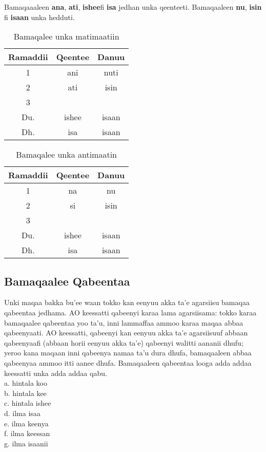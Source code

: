 \documentclass[11pt,b5paper]{book}
\begin{document}
Bamaqaaaleen \textbf{ana}, \textbf{ati}, \textbf{ishee}fi \textbf{isa} jedhan unka qeenteeti. Bamaqaaleen \textbf{nu}, \textbf{isin} fi \textbf{isaan} unka hedduti. 

\begin{table}[H]
	\centering
	\begin{tabular}{|c|c|c|}
		\hline
		Ramaddii & Qeentee & Danuu \\
		\hline
		1 & ani & nuti \\
		\hline
		2 & ati & isin \\
		\hline
		3 &  &  \\
		Du. & ishee & isaan \\
		Dh. & isa & isaan \\
		\hline
	\end{tabular}
	\caption{Bamaqalee unka matimaatiin}
\end{table}

\begin{table}[H]
	\centering
	\begin{tabular}{|c|c|c|}
		\hline
		Ramaddii & Qeentee & Danuu \\
		\hline
		1 & na & nu \\
		\hline
		2 & si & isin \\
		\hline
		3 &  &  \\
		Du. & ishee & isaan \\
		Dh. & isa & isaan \\
		\hline
	\end{tabular}
	\caption{Bamaqalee unka antimaatin}
\end{table}

\subsection{ Bamaqaalee Qabeentaa}

Unki maqaa bakka bu'ee waan tokko kan eenyuu akka ta'e agarsiisu bamaqaa qabeentaa jedhama. AO keessatti qabeenyi
karaa lama agarsiisama: tokko karaa bamaqaalee qabeentaa yoo ta'u, inni lammaffaa ammoo karaa maqaa abbaa
qabeenyaati. AO keessatti, qabeenyi kan eenyuu akka ta'e agarsiisuuf abbaan qabeenyaafi (abbaan horii eenyuu akka
ta'e) qabeenyi walitti aananii dhufu; yeroo kana maqaan inni qabeenya namaa ta'u dura dhufa, bamaqaaleen abbaa
qabeenyaa ammoo itti aanee dhufa. Bamaqaaleen qabeentaa looga adda addaa keessatti unka adda addaa qabu. \\
a. hintala koo\\
b. hintala kee\\
c. hintala ishee\\
d. ilma isaa\\
e. ilma keenya\\
f. ilma keessan\\
g. ilma isaanii
\end{document}
